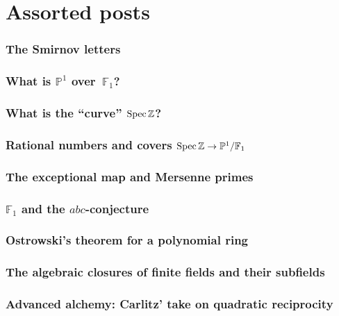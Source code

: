 \documentclass[a4paper]{memoir}
\begin{document}
\part{Assorted posts}

\setcounter{section}{0}

\section{The Smirnov letters}


\section{What is $\mathbb{P}^1$ over~$\mathbb{F}_1$?}

\section{What is the ``curve'' $\operatorname{Spec}\mathbb{Z}$?}

\section{Rational numbers and covers $\operatorname{Spec}\mathbb{Z}\to\mathbb{P}^1/\mathbb{F}_1$}

\section{The exceptional map and Mersenne primes}

\section{$\mathbb{F}_1$ and the $abc$-conjecture}

\section{Ostrowski's theorem for a polynomial ring}

\section{The algebraic closures of finite fields and their subfields}


\section{Advanced alchemy: Carlitz' take on quadratic reciprocity}
\end{document}
